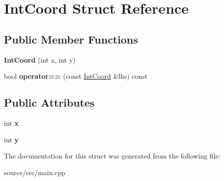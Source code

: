 \hypertarget{struct_int_coord}{}\section{Int\+Coord Struct Reference}
\label{struct_int_coord}
\subsection*{Public Member Functions}
\begin{DoxyCompactItemize}
\item 
{\bfseries Int\+Coord} (int x, int y)\hypertarget{struct_int_coord_a0e71a2a3e23baf93f62aeac59a5e324f}{}\label{struct_int_coord_a0e71a2a3e23baf93f62aeac59a5e324f}

\item 
bool {\bfseries operator==} (const \hyperlink{struct_int_coord}{Int\+Coord} \&lhs) const \hypertarget{struct_int_coord_a366d06d5a1524c48f2a0c374949c9175}{}\label{struct_int_coord_a366d06d5a1524c48f2a0c374949c9175}

\end{DoxyCompactItemize}
\subsection*{Public Attributes}
\begin{DoxyCompactItemize}
\item 
int {\bfseries x}\hypertarget{struct_int_coord_a9d26d75a4264aabef38c15ae27b80ef8}{}\label{struct_int_coord_a9d26d75a4264aabef38c15ae27b80ef8}

\item 
int {\bfseries y}\hypertarget{struct_int_coord_a9491cbad80ce5807fb3e32cfc0bafe79}{}\label{struct_int_coord_a9491cbad80ce5807fb3e32cfc0bafe79}

\end{DoxyCompactItemize}


The documentation for this struct was generated from the following file\+:\begin{DoxyCompactItemize}
\item 
source/src/main.\+cpp\end{DoxyCompactItemize}
